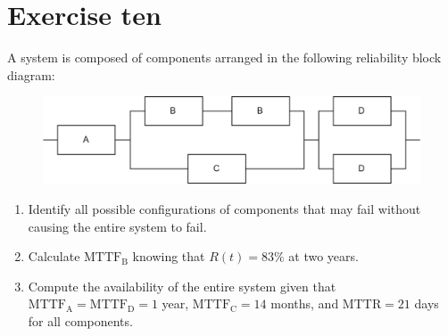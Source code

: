\section{Exercise ten}

A system is composed of components arranged in the following reliability block diagram:
\begin{figure}[H]
    \centering
    \includegraphics[width=0.7\linewidth]{images/rbd2.png}
\end{figure}
\begin{enumerate}
    \item Identify all possible configurations of components that may fail without causing the entire system to fail.
    \item Calculate $\text{MTTF}_\text{B}$ knowing that $R(t) = 83\%$ at two years.
    \item Compute the availability of the entire system given that $\text{MTTF}_\text{A}=\text{MTTF}_\text{D}=1$ year, $\text{MTTF}_\text{C} = 14$ months, and $\text{MTTR}=21$ days for all components.
\end{enumerate}

